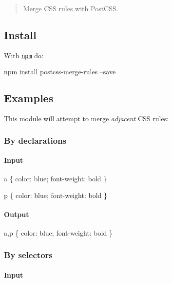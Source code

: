 \begin{quote}
Merge C\+SS rules with Post\+C\+SS. \end{quote}


\subsection*{Install}

With \href{https://npmjs.org/package/postcss-merge-rules}{\tt npm} do\+:


\begin{DoxyCode}
npm install postcss-merge-rules --save
\end{DoxyCode}


\subsection*{Examples}

This module will attempt to merge {\itshape adjacent} C\+SS rules\+:

\subsubsection*{By declarations}

\paragraph*{Input}


\begin{DoxyCode}
a \{
    color: blue;
    font-weight: bold
\}

p \{
    color: blue;
    font-weight: bold
\}
\end{DoxyCode}


\paragraph*{Output}


\begin{DoxyCode}
a,p \{
    color: blue;
    font-weight: bold
\}
\end{DoxyCode}


\subsubsection*{By selectors}

\paragraph*{Input}


